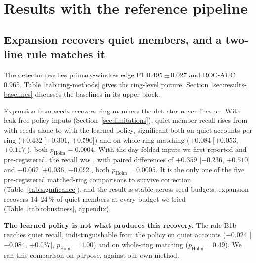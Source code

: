 \section{Results with the reference pipeline}
\label{sec:results}

\subsection{Expansion recovers quiet members, and a two-line rule matches it}
\label{sec:results-expansion}

The detector reaches primary-window edge F1 $0.495 \pm 0.027$ and ROC-AUC 0.965.
Table~\ref{tab:ring-methods} gives the ring-level picture; Section~\ref{sec:results-baselines}
discusses the baselines in its upper block.



Expansion from seeds recovers ring members the detector never fires on. With leak-free policy
inputs (Section~\ref{sec:limitations}), quiet-member recall rises from 
with seeds alone to  with the learned policy, significant both on quiet
accounts per ring ($+0.432$ [$+0.301$, $+0.590$]) and on whole-ring matching ($+0.084$ [$+0.053$,
$+0.117$]), both $p_{\mathrm{Holm}}=0.0004$.
With the day-folded inputs we first reported and pre-registered, the recall was
, with paired differences of $+0.359$ [$+0.236$, $+0.510$] and $+0.062$
[$+0.036$, $+0.092$], both $p_{\mathrm{Holm}}=0.0005$.
It is the only one of the five pre-registered matched-ring comparisons to survive correction
(Table~\ref{tab:significance}), and the result is stable across seed budgets: expansion
recovers 14--24\,\% of quiet members at every budget we tried
(Table~\ref{tab:robustness}, appendix).



\textbf{The learned policy is not what produces this recovery.} The rule B1b reaches
 quiet recall, indistinguishable from the policy on quiet accounts
($-0.024$ [$-0.084$, $+0.037$], $p_{\mathrm{Holm}}=1.00$) and on whole-ring matching
($p_{\mathrm{Holm}}=0.49$).
We ran this comparison on purpose, against our own method.

